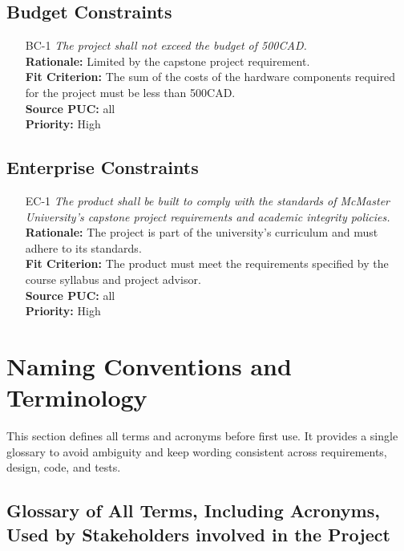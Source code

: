 \documentclass[12pt]{article}
\begin{document}
\subsection{Budget Constraints}

\begin{itemize}[leftmargin=*]
  \item[BC-1] \emph{The project shall not exceed the budget of 500CAD.}\\[2mm]
        \textbf{Rationale:} Limited by the capstone project requirement.\\
        \textbf{Fit Criterion:} The sum of the costs of the hardware components required for the project must be less than 500CAD.\\
        \textbf{Source PUC:} all\\
        \textbf{Priority:} High
\end{itemize}

\subsection{Enterprise Constraints}

\begin{itemize}[leftmargin=*]
  \item[EC-1] \emph{The product shall be built to comply with the standards of McMaster
          University's capstone project requirements and academic integrity policies.}\\[2mm]
        \textbf{Rationale:} The project is part of the university's curriculum and must adhere to its standards.\\
        \textbf{Fit Criterion:} The product must meet the requirements specified by the course syllabus and project advisor.\\
        \textbf{Source PUC:} all\\
        \textbf{Priority:} High
\end{itemize}

\section{Naming Conventions and Terminology}
This section defines all terms and acronyms before first use. It provides a
single glossary to avoid ambiguity and keep wording consistent across
requirements, design, code, and tests.
\subsection{Glossary of All Terms, Including Acronyms, Used by Stakeholders
  involved in the Project}
\end{document}
